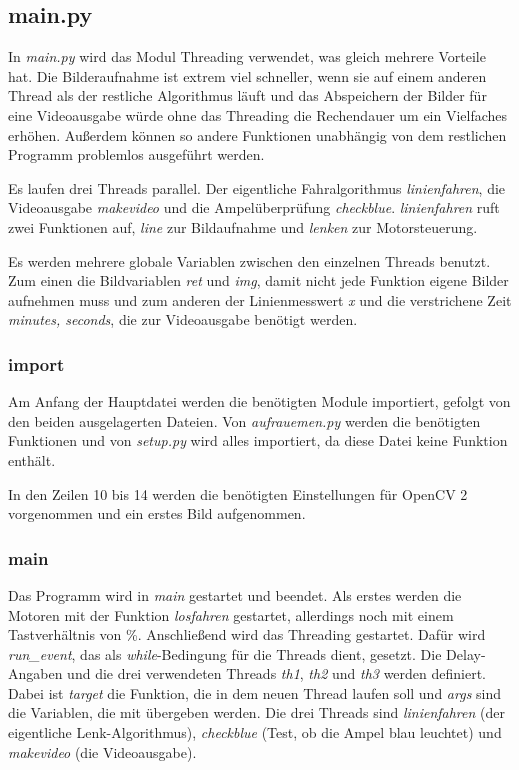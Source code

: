 \documentclass[a4paper, 12pt]{scrartcl}
\begin{document}
\subsection{main.py}

In \textit{main.py} wird das Modul Threading verwendet, was gleich mehrere Vorteile hat. Die Bilderaufnahme ist extrem viel schneller, wenn sie auf einem anderen Thread als der restliche Algorithmus läuft und das Abspeichern der Bilder für eine Videoausgabe würde ohne das Threading die Rechendauer um ein Vielfaches erhöhen. Außerdem können so andere Funktionen unabhängig von dem restlichen Programm problemlos ausgeführt werden.

Es laufen drei Threads parallel. Der eigentliche Fahralgorithmus \textit{linienfahren}, die Videoausgabe \textit{makevideo} und die Ampelüberprüfung \textit{checkblue}. \textit{linienfahren} ruft zwei Funktionen auf, \textit{line} zur Bildaufnahme und \textit{lenken} zur Motorsteuerung.

Es werden mehrere globale Variablen zwischen den einzelnen Threads benutzt. Zum einen die Bildvariablen \textit{ret} und \textit{img}, damit nicht jede Funktion eigene Bilder aufnehmen muss und zum anderen der Linienmesswert \textit{x} und die verstrichene Zeit \textit{minutes, seconds}, die zur Videoausgabe benötigt werden.

\subsubsection{import}


Am Anfang der Hauptdatei werden die benötigten Module importiert, gefolgt von den beiden ausgelagerten Dateien. Von \textit{aufrauemen.py} werden die benötigten Funktionen und von \textit{setup.py} wird alles importiert, da diese Datei keine Funktion enthält.

In den Zeilen 10 bis 14 werden die benötigten Einstellungen für OpenCV 2 vorgenommen und ein erstes Bild aufgenommen.

\subsubsection{main}


Das Programm wird in \textit{main} gestartet und beendet. Als erstes werden die Motoren mit der Funktion \textit{losfahren} gestartet, allerdings noch mit einem Tastverhältnis von \unit[0]{\%}.
Anschließend wird das Threading gestartet. Dafür wird \textit{run\_event}, das als \textit{while}-Bedingung für die Threads dient, gesetzt. Die Delay-Angaben und die drei verwendeten Threads \textit{th1}, \textit{th2} und \textit{th3} werden definiert. Dabei ist \textit{target} die Funktion, die in dem neuen Thread laufen soll und \textit{args} sind die Variablen, die mit übergeben werden.
Die drei Threads sind \textit{linienfahren} (der eigentliche Lenk-Algorithmus), \textit{checkblue} (Test, ob die Ampel blau leuchtet) und \textit{makevideo} (die Videoausgabe).
\end{document}
